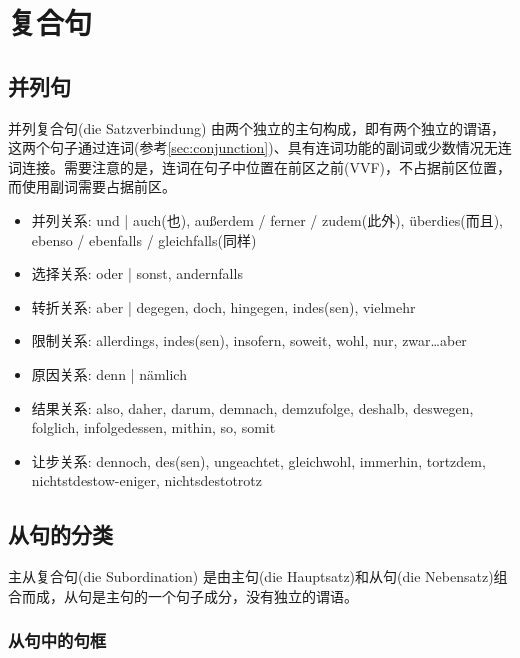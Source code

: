 \section{复合句}

\subsection{并列句}
并列复合句(die Satzverbindung) 由两个独立的主句构成，即有两个独立的谓语，这两个句子通过连词(参考\cref{sec:conjunction})、具有连词功能的副词或少数情况无连词连接。需要注意的是，连词在句子中位置在前区之前(VVF)，不占据前区位置，而使用副词需要占据前区。

\begin{itemize}
    \item 并列关系: und | auch(也), außerdem / ferner / zudem(此外), überdies(而且), ebenso / ebenfalls / gleichfalls(同样)

    \item 选择关系: oder | sonst, andernfalls

    \item 转折关系: aber | degegen, doch, hingegen, indes(sen), vielmehr

    \item 限制关系: allerdings, indes(sen), insofern, soweit, wohl, nur, zwar\ldots aber

    \item 原因关系: denn | nämlich

    \item 结果关系: also, daher, darum, demnach, demzufolge, deshalb, deswegen, folglich, infolgedessen, mithin, so, somit

    \item 让步关系: dennoch, des(sen), ungeachtet, gleichwohl, immerhin, tortzdem, nichtstdestow-eniger, nichtsdestotrotz
\end{itemize}

\subsection{从句的分类}

主从复合句(die Subordination) 是由主句(die Hauptsatz)和从句(die Nebensatz)组合而成，从句是主句的一个句子成分，没有独立的谓语。

\subsubsection{从句中的句框}

